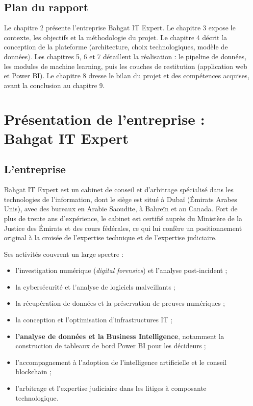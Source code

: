 \documentclass[12pt,a4paper]{report}
\begin{document}
\section{Plan du rapport}

Le chapitre 2 présente l'entreprise Bahgat IT Expert. Le chapitre 3 expose le
contexte, les objectifs et la méthodologie du projet. Le chapitre 4 décrit la
conception de la plateforme (architecture, choix technologiques, modèle de
données). Les chapitres 5, 6 et 7 détaillent la réalisation : le pipeline de
données, les modules de machine learning, puis les couches de restitution
(application web et Power BI). Le chapitre 8 dresse le bilan du projet et des
compétences acquises, avant la conclusion au chapitre 9.

\chapter{Présentation de l'entreprise : Bahgat IT Expert}

\section{L'entreprise}

Bahgat IT Expert est un cabinet de conseil et d'arbitrage spécialisé dans les
technologies de l'information, dont le siège est situé à Dubaï (Émirats Arabes
Unis), avec des bureaux en Arabie Saoudite, à Bahreïn et au Canada. Fort de
plus de trente ans d'expérience, le cabinet est certifié auprès du Ministère de
la Justice des Émirats et des cours fédérales, ce qui lui confère un
positionnement original à la croisée de l'expertise technique et de l'expertise
judiciaire.

Ses activités couvrent un large spectre :
\begin{itemize}
  \item l'investigation numérique (\textit{digital forensics}) et l'analyse
    post-incident ;
  \item la cybersécurité et l'analyse de logiciels malveillants ;
  \item la récupération de données et la préservation de preuves numériques ;
  \item la conception et l'optimisation d'infrastructures IT ;
  \item \textbf{l'analyse de données et la Business Intelligence}, notamment la
    construction de tableaux de bord Power BI pour les décideurs ;
  \item l'accompagnement à l'adoption de l'intelligence artificielle et le
    conseil blockchain ;
  \item l'arbitrage et l'expertise judiciaire dans les litiges à composante
    technologique.
\end{itemize}
\end{document}
